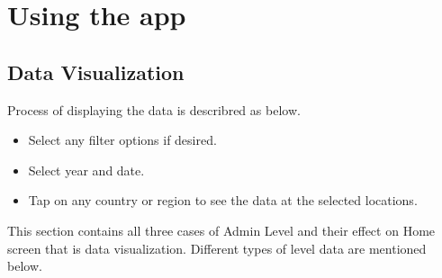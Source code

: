 \section{Using the app}

\subsection{Data Visualization}



Process of displaying the data is describred as below.

\begin{itemize}
    \item Select any filter options if desired.
    \item Select year and date.
    \item Tap on any country or region to see the data at the selected locations. \\
\end{itemize}

This section contains all three cases of Admin Level and their effect on Home screen that is data visualization. Different types of level data are mentioned below.

